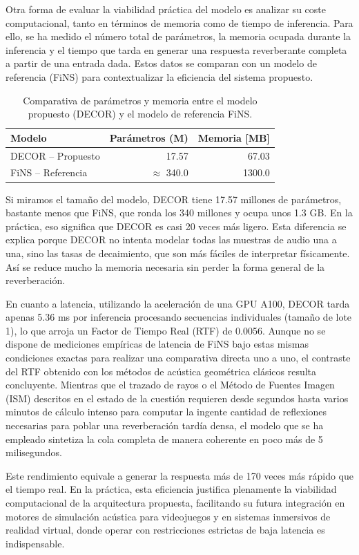 Otra forma de evaluar la viabilidad práctica del modelo es analizar su coste computacional, tanto en términos de memoria como de tiempo de inferencia. Para ello, se ha medido el número total de parámetros, la memoria ocupada durante la inferencia y el tiempo que tarda en generar una respuesta reverberante completa a partir de una entrada dada. Estos datos se comparan con un modelo de referencia (FiNS) para contextualizar la eficiencia del sistema propuesto.

\begin{table}[htbp]
\centering
\small
\setlength{\tabcolsep}{8pt}
\renewcommand{\arraystretch}{1.15}
\begin{tabular}{lrr}
\toprule
\textbf{Modelo} & \textbf{Parámetros (M)} & \textbf{Memoria [MB]} \\
\midrule
DECOR -- Propuesto & 17.57 & 67.03 \\
FiNS -- Referencia & $\approx$ 340.0 & 1300.0 \\
\bottomrule
\end{tabular}
\caption[Comparativa de complejidad]{Comparativa de parámetros y memoria entre el modelo propuesto (DECOR) y el modelo de referencia FiNS.}
\label{tab:complejidad}
\end{table}

Si miramos el tamaño del modelo, DECOR tiene 17.57 millones de parámetros, bastante menos que FiNS, que ronda los 340 millones y ocupa unos 1.3 GB. En la práctica, eso significa que DECOR es casi 20 veces más ligero. Esta diferencia se explica porque DECOR no intenta modelar todas las muestras de audio una a una, sino las tasas de decaimiento, que son más fáciles de interpretar físicamente. Así se reduce mucho la memoria necesaria sin perder la forma general de la reverberación.

En cuanto a latencia, utilizando la aceleración de una GPU A100, DECOR tarda apenas 5.36 ms por inferencia procesando secuencias individuales (tamaño de lote 1), lo que arroja un Factor de Tiempo Real (RTF) de 0.0056. Aunque  no se dispone de mediciones empíricas de latencia de FiNS bajo estas mismas condiciones exactas para realizar una comparativa directa uno a uno, el contraste del RTF obtenido con los métodos de acústica geométrica clásicos resulta concluyente. Mientras que el trazado de rayos o el Método de Fuentes Imagen (ISM) descritos en el estado de la cuestión requieren desde segundos hasta varios minutos de cálculo intenso para computar la ingente cantidad de reflexiones necesarias para poblar una reverberación tardía densa, el modelo que se ha empleado sintetiza la cola completa de manera coherente en poco más de 5 milisegundos.

Este rendimiento equivale a generar la respuesta más de 170 veces más rápido que el tiempo real. En la práctica, esta eficiencia justifica plenamente la viabilidad computacional de la arquitectura propuesta, facilitando su futura integración en motores de simulación acústica para videojuegos y en sistemas inmersivos de realidad virtual, donde operar con restricciones estrictas de baja latencia es indispensable.


